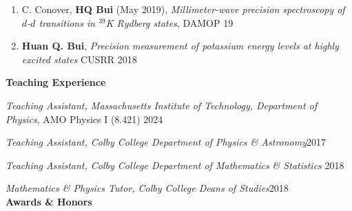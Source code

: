 \documentclass[10pt]{article}
\begin{document}
\begin{enumerate}
	\item C. Conover, \textbf{HQ Bui} (May 2019), \textit{Millimeter-wave precision spectroscopy of $d$-$d$ transitions in $^{\text{39}}$K Rydberg states},
	DAMOP 19
	
	
	\item \textbf{Huan Q. Bui}, \textit{Precision measurement of potassium energy levels at highly excited states} 
	CUSRR 2018
\end{enumerate}

\noindent \large{{\textbf{Teaching Experience}}} \normalsize \\ 

\vspace{-5pt}

\noindent \textit{Teaching Assistant, Massachusetts Institute of Technology, Department of Physics}, AMO Physics I (8.421) \hfill 2024

\noindent \textit{Teaching Assistant, Colby College Department of Physics \& Astronomy}\hfill 2017 

\noindent \textit{Teaching Assistant, Colby College Department of Mathematics \& Statistics} \hfill 2018 

\noindent \textit{Mathematics \& Physics Tutor, Colby College Deans of Studies}\hfill 2018\\


\noindent \large{\textbf{{Awards \& Honors }}}  \normalsize 
\end{document}
